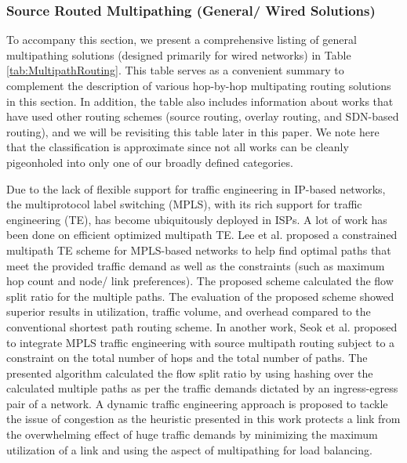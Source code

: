 \documentclass[10pt]{IEEEtran}
\begin{document}
\vspace{2mm}
\subsubsection{Source Routed Multipathing (General/ Wired Solutions)}
\label{subsub: w_g_source_routing}





To accompany this section, we present a comprehensive listing of general multipathing solutions (designed primarily for wired networks) in Table \ref{tab:MultipathRouting}. This table serves as a convenient summary to complement the description of various hop-by-hop multipating routing solutions in this section. In addition, the table also includes information about works that have used other routing schemes (source routing, overlay routing, and SDN-based routing), and we will be revisiting this table later in this paper. We note here that the classification is approximate since not all works can be cleanly pigeonholed into only one of our broadly defined categories.

Due to the lack of flexible support for traffic engineering in IP-based networks, the multiprotocol label switching (MPLS), with its rich support for traffic engineering (TE), has become ubiquitously deployed in ISPs. A lot of work has been done on efficient optimized multipath TE. Lee et al. \cite{lee2002constrained} proposed a constrained multipath TE scheme for MPLS-based networks to help find optimal paths that meet the provided traffic demand as well as the constraints (such as maximum hop count and node/ link preferences). The proposed scheme calculated the flow split ratio for the multiple paths. The evaluation of the proposed scheme showed superior results in utilization, traffic volume, and overhead compared to the conventional shortest path routing scheme. In another work, Seok et al. \cite{seok2001dynamic} proposed to integrate MPLS traffic engineering with source multipath routing subject to a constraint on the total number of hops and the total number of paths. The presented algorithm calculated the flow split ratio by using hashing over the calculated multiple paths as per the traffic demands dictated by an ingress-egress pair of a network. A dynamic traffic engineering approach is proposed to tackle the issue of congestion as the heuristic presented in this work protects a link from the overwhelming effect of huge traffic demands by minimizing the maximum utilization of a link and using the aspect of multipathing for load balancing.
\end{document}
